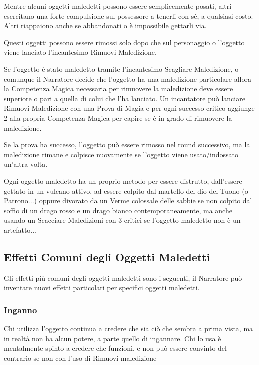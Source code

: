 \begin{multicols}{2}
Mentre alcuni oggetti maledetti possono essere semplicemente posati, altri esercitano una forte compulsione sul possessore a tenerli con sé, a qualsiasi costo. Altri riappaiono anche se abbandonati o è impossibile gettarli via.

Questi oggetti possono essere rimossi solo dopo che sul personaggio o l'oggetto viene lanciato l'incantesimo Rimuovi Maledizione.

Se l'oggetto è stato maledetto tramite l'incantesimo Scagliare Maledizione, o comunque il Narratore decide che l'oggetto ha una maledizione particolare allora la Competenza Magica necessaria per rimuovere la maledizione deve essere superiore o pari a quella di colui che l'ha lanciato.
Un incantatore può lanciare Rimuovi Maledizione con una Prova di Magia e per ogni successo critico aggiunge 2 alla propria Competenza Magica per capire se è in grado di rimuovere la maledizione.

Se la prova ha successo, l'oggetto può essere rimosso nel round successivo, ma la maledizione rimane e colpisce nuovamente se l'oggetto viene usato/indossato un'altra volta.

Ogni oggetto maledetto ha un proprio metodo per essere distrutto, dall'essere gettato in un vulcano attivo, ad essere colpito dal martello del dio del Tuono (o Patrono...) oppure divorato da un Verme colossale delle sabbie se non colpito dal soffio di un drago rosso e un drago bianco contemporaneamente, ma anche usando un Scacciare Maledizioni con 3 critici se l'oggetto maledetto non è un artefatto...

\subsection{Effetti Comuni degli Oggetti Maledetti}

Gli effetti più comuni degli oggetti maledetti sono i seguenti, il Narratore può inventare nuovi effetti particolari per specifici oggetti maledetti.

\subsubsection{Inganno}

Chi utilizza l'oggetto continua a credere che sia ciò che sembra a prima vista, ma in realtà non ha alcun potere, a parte quello di ingannare. Chi lo usa è mentalmente spinto a credere che funzioni, e non può essere convinto del contrario se non con l'uso di Rimuovi maledizione


\end{multicols}
